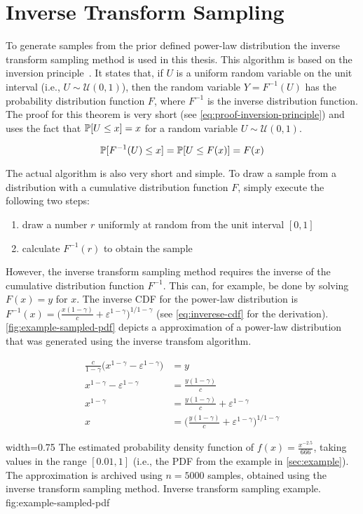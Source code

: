 \section{Inverse Transform Sampling}
\label{sec:inverse-transform-sampling}

To generate samples from the prior defined power-law distribution the inverse transform sampling method is used in this thesis.
This algorithm is based on the inversion principle~\cite{Devroye1986}.
It states that, if \(U\) is a uniform random variable on the unit interval (i.e., \(U \sim \mathcal{U}(0,1)\)), then the random variable \(Y = F^{-1}(U)\) has the probability distribution function \(F\), where \(F^{-1}\) is the inverse distribution function.
The proof for this theorem is very short (see \autoref{eq:proof-inversion-principle}) and uses the fact that \(\mathbb{P}[{U \leq x}] = x\) for a random variable \(U \sim \mathcal{U}(0,1)\).

\begin{equation}
    \mathbb{P}[{F^{-1}(U) \leq x}] = \mathbb{P}[{U \leq F(x)}] = F(x)
    \label{eq:proof-inversion-principle}
\end{equation}

The actual algorithm is also very short and simple.
To draw a sample from a distribution with a cumulative distribution function \(F\), simply execute the following two steps:

\begin{enumerate}
    \item draw a number \(r\) uniformly at random from the unit interval \([0, 1]\)
    \item calculate \(F^{-1}(r)\) to obtain the sample
\end{enumerate}

However, the inverse transform sampling method requires the inverse of the cumulative distribution function \(F^{-1}\).
This can, for example, be done by solving \(F(x) = y\) for \(x\).
The inverse CDF for the power-law distribution is \(F^{-1}(x) = \Big( \frac{x(1-\gamma)}{c} + \varepsilon^{1-\gamma} \Big)^{1/1-\gamma}\) (see \autoref{eq:inverese-cdf} for the derivation).
\autoref{fig:example-sampled-pdf} depicts a approximation of a power-law distribution that was generated using the inverse transfom algorithm.

\begin{align}
	\frac{c}{1-\gamma} \Big( x^{1 - \gamma} - \varepsilon^{1 - \gamma} \Big) & = y \\
    x^{1-\gamma} - \varepsilon^{1-\gamma} & = \frac{y(1-\gamma)}{c} \\
    x^{1-\gamma} & = \frac{y(1-\gamma)}{c} + \varepsilon^{1-\gamma} \\
    x & = \Big( \frac{y(1-\gamma)}{c} + \varepsilon^{1-\gamma} \Big)^{1/1-\gamma}
\label{eq:inverese-cdf}
\end{align}

      {width=0.75\textwidth}
      {The estimated probability density function of \(f(x) = \frac{x^{-2.5}}{666}\), taking values in the range \([0.01, 1]\) (i.e., the PDF from the example in \autoref{sec:example}). The approximation is archived using \(n = 5000\) samples, obtained using the inverse transform sampling method.}
      {Inverse transform sampling example.}
      {fig:example-sampled-pdf}
